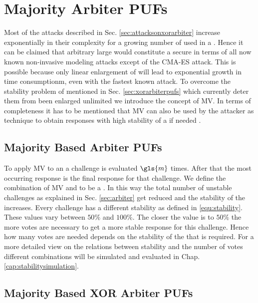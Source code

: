 \chapter{Majority Arbiter PUFs}
\label{cap:majorityarbiter}

Most of the attacks described in Sec. \ref{sec:attacksonxorarbiter} increase exponentially in their complexity for a growing number of used \apufs in a \xpuf. 
Hence it can be claimed that arbitrary large \xpufs would constitute a secure \puf in terms of all now known non-invasive modeling attacks except of the \ac{CMA-ES} attack.
This is possible because only linear enlargement of \xpufs will lead to exponential growth in time consumptionm, even with the fastest known attack.
To overcome the stability problem of \xpufs mentioned in Sec. \ref{sec:xorarbiterpufs} which currently deter them from been enlarged unlimited we introduce the concept of \ac{MV}. %
In terms of completeness it has to be mentioned that \ac{MV} can also be used by the attacker as technique to obtain responses with high stability of a \puf if needed \cite{Ganji2016PACPUFs, Ozturk2008TowardsDevices}.

\section{Majority Based Arbiter PUFs}
\label{sec:majorityarbiter}

To apply \ac{MV} to an \apuf a challenge is evaluated $\gls{m}$ times.
After that the most occurring response is the final response for that challenge.
We define the combination of \ac{MV} and \apuf to be a \mpuf.
In this way the total number of unstable challenges as explained in Sec. \ref{sec:arbiter} get reduced and the stability of the \apuf increases.
Every challenge has a different stability as defined in \ref{equ:stability}.%
These values vary between $50 \%$ and $100 \%$.
The closer the value is to $50 \%$ the more votes are necessary to get a more stable response for this challenge.
Hence how many votes are needed depends on the stability of the \apuf that is required. 
For a more detailed view on the relations between stability and the number of votes different combinations will be simulated and evaluated in Chap. \ref{cap:stabilitysimulation}.


\section{Majority Based XOR Arbiter PUFs}
\label{sec:majorityxorarbiter}

